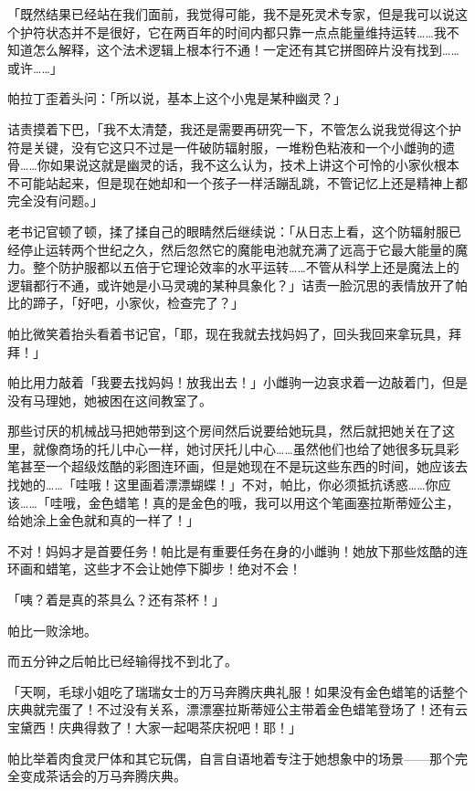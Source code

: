 「既然结果已经站在我们面前，我觉得可能，我不是死灵术专家，但是我可以说这个护符状态并不是很好，它在两百年的时间内都只靠一点点能量维持运转……我不知道怎么解释，这个法术逻辑上根本行不通！一定还有其它拼图碎片没有找到……或许……」

帕拉丁歪着头问：「所以说，基本上这个小鬼是某种幽灵？」

诘责摸着下巴，「我不太清楚，我还是需要再研究一下，不管怎么说我觉得这个护符是关键，没有它这只不过是一件破防辐射服，一堆粉色粘液和一个小雌驹的遗骨……你如果说这就是幽灵的话，我不这么认为，技术上讲这个可怜的小家伙根本不可能站起来，但是现在她却和一个孩子一样活蹦乱跳，不管记忆上还是精神上都完全没有问题。」

老书记官顿了顿，揉了揉自己的眼睛然后继续说：「从日志上看，这个防辐射服已经停止运转两个世纪之久，然后忽然它的魔能电池就充满了远高于它最大能量的魔力。整个防护服都以五倍于它理论效率的水平运转……不管从科学上还是魔法上的逻辑都行不通，或许她是小马灵魂的某种具象化？」诘责一脸沉思的表情放开了帕比的蹄子，「好吧，小家伙，检查完了？」

帕比微笑着抬头看着书记官，「耶，现在我就去找妈妈了，回头我回来拿玩具，拜拜！」

\horizonline


帕比用力敲着「我要去找妈妈！放我出去！」小雌驹一边哀求着一边敲着门，但是没有马理她，她被困在这间教室了。

那些讨厌的机械战马把她带到这个房间然后说要给她玩具，然后就把她关在了这里，就像商场的托儿中心一样，她讨厌托儿中心……虽然他们也给了她很多玩具彩笔甚至一个超级炫酷的彩图连环画，但是她现在不是玩这些东西的时间，她应该去找她的……「哇哦！这里画着漂漂蝴蝶！」不对，帕比，你必须抵抗诱惑……你应该……「哇哦，金色蜡笔！真的是金色的哦，我可以用这个笔画塞拉斯蒂娅公主，给她涂上金色就和真的一样了！」

不对！妈妈才是首要任务！帕比是有重要任务在身的小雌驹！她放下那些炫酷的连环画和蜡笔，这些才不会让她停下脚步！绝对不会！

「咦？着是真的茶具么？还有茶杯！」

帕比一败涂地。

而五分钟之后帕比已经输得找不到北了。

「天啊，毛球小姐吃了瑞瑞女士的万马奔腾庆典礼服！如果没有金色蜡笔的话整个庆典就完蛋了！不过没有关系，漂漂塞拉斯蒂娅公主带着金色蜡笔登场了！还有云宝黛西！庆典得救了！大家一起喝茶庆祝吧！耶！」

帕比举着肉食灵尸体和其它玩偶，自言自语地着专注于她想象中的场景——那个完全变成茶话会的万马奔腾庆典。

